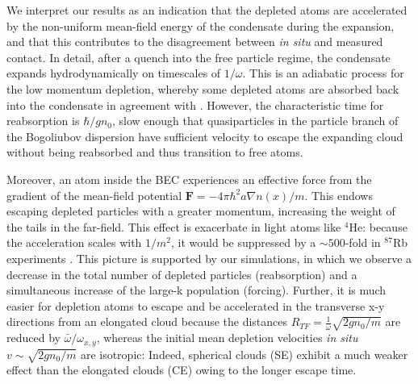 	We interpret our results as an indication that the depleted atoms are accelerated by the non-uniform mean-field energy of the condensate during the expansion, and that this contributes to the disagreement between \emph{in situ} and measured contact. In detail, after a quench into the free particle regime, the condensate expands hydrodynamically on timescales of $1/\omega$. This is an adiabatic process for the low momentum depletion, whereby some depleted atoms are absorbed back into the condensate in agreement with \cite{qu16}. However, the characteristic time for reabsorption is $\hbar/gn_0$, slow enough that quasiparticles in the particle branch of the Bogoliubov dispersion have sufficient velocity to escape the expanding cloud without being reabsorbed and thus transition to free atoms. 
	
	Moreover, an atom inside the BEC experiences an effective force from the gradient of the mean-field potential $\textbf{F} = -4\pi\hbar^2a \nabla  n(x)/m$. This endows escaping depleted particles with a greater momentum, increasing the weight of the tails in the far-field. This effect is exacerbate in light atoms like $^{4}$He: because the acceleration scales with $1/m^2$, it would be suppressed by a $\sim500$-fold in $^{87}$Rb experiments \cite{makotyn14}. This picture is supported by our simulations, in which we observe a decrease in the total number of depleted particles (reabsorption) and a simultaneous increase of the large-k population (forcing). Further, it is much easier for depletion atoms to escape and be accelerated in the transverse x-y directions from an elongated cloud because the distances $R_{TF}=\frac{1}{\omega}\sqrt{2gn_0/m}$ are reduced by $\bar{\omega}/\omega_{x,y}$, whereas the initial mean depletion velocities \textit{in situ} $v\sim \sqrt{2gn_0/m}$ are isotropic: Indeed, spherical clouds (SE) exhibit a much weaker effect than the elongated clouds (CE) owing to the longer escape time.
	 

